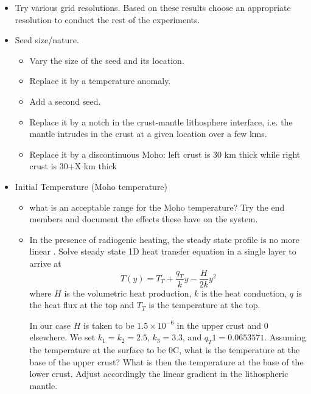 \begin{itemize}
\item Try various grid resolutions. Based on these results choose an appropriate resolution to conduct the rest of the experiments.

\item Seed size/nature. 
   \begin{itemize}
   \item Vary the size of the seed and its location. 
   \item Replace it by a temperature anomaly. 
   \item Add a second seed.
   \item Replace it by a notch in the crust-mantle lithosphere interface, i.e. the mantle intrudes in the crust at a given location over a few kms. 
   \item Replace it by a discontinuous Moho: left crust is 30 km thick while right crust is 30+X km thick
   \end{itemize}

\item Initial Temperature (Moho temperature)
   \begin{itemize}
   \item what is an acceptable range for the Moho temperature? Try the end members and document the effects these have on the system.
   \item In the presence of radiogenic heating, the steady state profile is no more linear \cite{chap86}.
   Solve steady state 1D heat transfer equation in a single layer to arrive at 
   \[
   T(y) = T_T + \frac{q_T}{k} y - \frac{H}{2k}y^2
   \]
   where $H$ is the volumetric heat production, $k$ is the heat conduction, $q$ is the heat flux at the top and 
   $T_T$ is the temperature at the top.

   In our case $H$ is taken to be $1.5\times10^{-6}$ in the upper crust and 0 elsewhere. We set $k_1=k_2=2.5$, $k_3=3.3$, and $q_T1=0.0653571$. 
   Assuming the temperature at the surface to be 0C, what is the temperature at the base of the upper crust?
   What is then the temperature at the base of the lower crust. Adjust accordingly the linear gradient in the lithospheric mantle.


\end{itemize}


\end{itemize}
